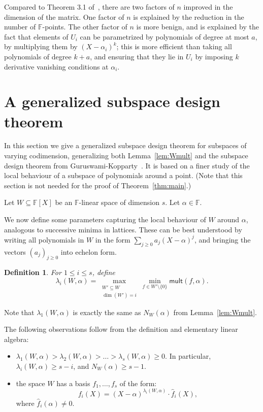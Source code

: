 \documentclass{article}
\newtheorem{definition}[theorem]{Definition}
\newcommand{\F}{\mathbb{F}}
\newcommand{\mult}{\mathsf{mult}}
\begin{document}
\begin{itemize}
    Compared to Theorem 3.1 of~\cite{CGGRT26}, there are two factors of $n$ improved in the dimension of the matrix. One factor of $n$ is explained by the reduction in the number of $\F$-points. The other factor of $n$ is more benign, and is explained by the fact that elements of $U_i$ can be parametrized by polynomials of degree at most $a$, by multiplying them by $(X-\alpha_i)^k$; this is more efficient than taking all polynomials of degree $k+a$, and ensuring that they lie in $U_i$ by imposing $k$ derivative vanishing conditions at $\alpha_i$.
\end{itemize}


\section{A generalized subspace design theorem}\label{sec:generalized-sd}

In this section we give a generalized subspace design theorem for subspaces of varying codimension, generalizing both  Lemma~\ref{lem:Wmult} and the subspace design theorem from Guruswami-Kopparty~\cite{GK16}.
It is based on a finer study of the local behaviour of a subspace of polynomials around a point.
(Note that this section is not needed for the proof of Theorem~\ref{thm:main}.)

Let $W \subseteq \F[X]$ be an $\F$-linear space of dimension $s$.
Let $\alpha \in \F$.

We now define some parameters capturing the local behaviour of $W$ around $\alpha$,
analogous to successive minima in lattices. These can be best understood by writing
all polynomials in $W$ in the form $\sum_{j \geq 0} a_j (X-\alpha)^j$, and bringing the
vectors $(a_j)_{j \geq 0}$ into echelon form.

\begin{definition}
    For $1 \leq i \leq s$,
    define
    $$\lambda_i(W, \alpha) =  \max_{\substack{W' \subseteq W \\ \dim(W')=i} } \min_{f \in W' \setminus \{0\}} \mult(f, \alpha).$$
\end{definition}
Note that $\lambda_1(W,\alpha)$ is exactly the same as $N_W(\alpha)$ from Lemma~\ref{lem:Wmult}.

The following observations follow from the definition and elementary linear algebra:
\begin{itemize}
\item $\lambda_1(W,\alpha) > \lambda_2(W,\alpha) > \ldots > \lambda_s(W,\alpha) \geq 0$.
In particular, $\lambda_i(W,\alpha) \geq s - i$, and $N_W(\alpha) \geq s-1$.
    \item the space $W$ has a basis  $f_1, \ldots, f_s$ of the form:
$$ f_i(X) = (X- \alpha)^{\lambda_i(W, \alpha)} \cdot \hat{f}_i(X),$$
where $\hat{f}_i(\alpha) \neq 0$.
\end{itemize}
\end{document}
